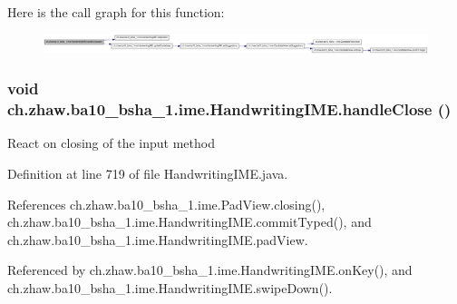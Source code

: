 Here is the call graph for this function:\nopagebreak
\begin{figure}[H]
\begin{center}
\leavevmode
\includegraphics[width=420pt]{classch_1_1zhaw_1_1ba10__bsha__1_1_1ime_1_1HandwritingIME_a5b7f7f06b8e6f5eb9797725b5d814f5c_cgraph}
\end{center}
\end{figure}
\hypertarget{classch_1_1zhaw_1_1ba10__bsha__1_1_1ime_1_1HandwritingIME_a4287014b4f552f286e8b51ef841573b1}{
\subsubsection[{handleClose}]{\setlength{\rightskip}{0pt plus 5cm}void ch.zhaw.ba10\_\-bsha\_\-1.ime.HandwritingIME.handleClose ()}}
\label{classch_1_1zhaw_1_1ba10__bsha__1_1_1ime_1_1HandwritingIME_a4287014b4f552f286e8b51ef841573b1}
React on closing of the input method 

Definition at line 719 of file HandwritingIME.java.

References ch.zhaw.ba10\_\-bsha\_\-1.ime.PadView.closing(), ch.zhaw.ba10\_\-bsha\_\-1.ime.HandwritingIME.commitTyped(), and ch.zhaw.ba10\_\-bsha\_\-1.ime.HandwritingIME.padView.

Referenced by ch.zhaw.ba10\_\-bsha\_\-1.ime.HandwritingIME.onKey(), and ch.zhaw.ba10\_\-bsha\_\-1.ime.HandwritingIME.swipeDown().

